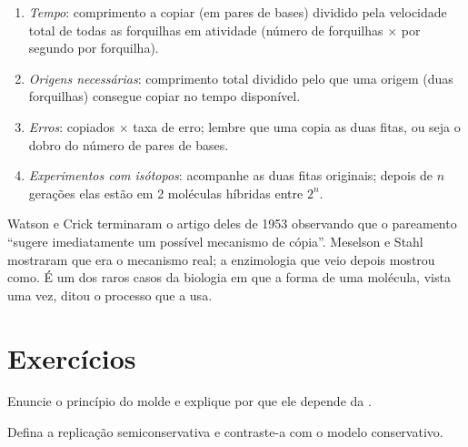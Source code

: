 \begin{method}\label{met:g11:dna-replication:calc}
\begin{enumerate}
  \item \emph{Tempo}: comprimento a copiar (em pares de bases)
        dividido pela velocidade total de todas as forquilhas em
        atividade (número de forquilhas $\times$  por
        segundo por forquilha).
  \item \emph{Origens necessárias}: comprimento total dividido pelo
        que uma origem (duas forquilhas) consegue copiar no tempo
        disponível.
  \item \emph{Erros}:  copiados $\times$ taxa de erro;
        lembre que uma  copia as duas fitas, ou seja o dobro do
        número de pares de bases.
  \item \emph{Experimentos com isótopos}: acompanhe as duas fitas
        originais; depois de $n$ gerações elas estão em 2 moléculas
        híbridas entre $2^n$.
\end{enumerate}
\end{method}

\begin{remark}\label{rem:g11:dna-replication:fit}
Watson e Crick terminaram o artigo deles de 1953 observando que o
pareamento ``sugere imediatamente um possível mecanismo de cópia''.
Meselson e Stahl mostraram que era o mecanismo real; a enzimologia que
veio depois mostrou como. É um dos raros casos da biologia em que a
forma de uma molécula, vista uma vez, ditou o processo que a usa.
\end{remark}

\section{Exercícios}

\begin{exercise}[$\star$]\label{exo:g11:dna-replication:1}
Enuncie o princípio do molde e explique por que ele depende da
.
\end{exercise}

\begin{exercise}[$\star$]\label{exo:g11:dna-replication:2}
Defina a replicação semiconservativa e contraste-a com o modelo
conservativo.
\end{exercise}

